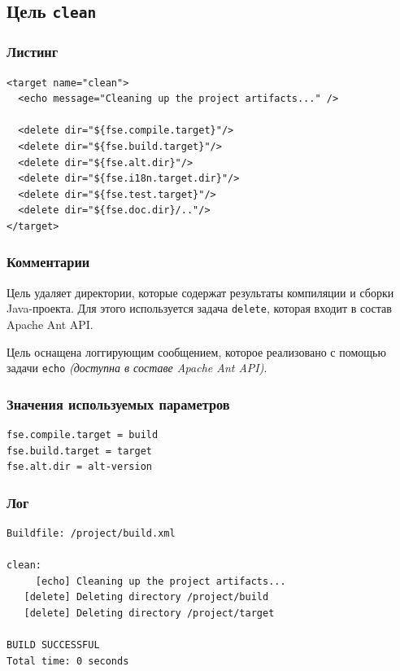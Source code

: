 \subsection{Цель \texttt{clean}}

\subsubsection{Листинг}

\begin{lstlisting}[caption={Часть содержимого файла \texttt{build.xml}},captionpos=b]
<target name="clean">
  <echo message="Cleaning up the project artifacts..." />

  <delete dir="${fse.compile.target}"/>
  <delete dir="${fse.build.target}"/>
  <delete dir="${fse.alt.dir}"/>
  <delete dir="${fse.i18n.target.dir}"/>
  <delete dir="${fse.test.target}"/>
  <delete dir="${fse.doc.dir}/.."/>
</target>
\end{lstlisting}

\subsubsection{Комментарии}

Цель удаляет директории, которые содержат результаты компиляции и сборки Java-проекта. Для этого используется задача \texttt{delete}, которая входит в состав Apache Ant API.

Цель оснащена логгирующим сообщением, которое реализовано с помощью задачи \texttt{echo} \textit{(доступна в составе Apache Ant API)}.

\subsubsection{Значения используемых параметров}

\begin{lstlisting}[language=Properties,caption={Часть содержимого файла \texttt{build.properties}},captionpos=b]
fse.compile.target = build
fse.build.target = target
fse.alt.dir = alt-version
\end{lstlisting}

\subsubsection{Лог}

\begin{lstlisting}[caption={Лог цели \texttt{clean}},language={},captionpos=b]
Buildfile: /project/build.xml

clean:
     [echo] Cleaning up the project artifacts...
   [delete] Deleting directory /project/build
   [delete] Deleting directory /project/target

BUILD SUCCESSFUL
Total time: 0 seconds
\end{lstlisting}
